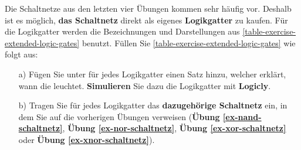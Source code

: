 \begin{exercise}\label{exercise-xor-nor-nand-xnor}
Die Schaltnetze aus den letzten vier Übungen kommen sehr häufig vor. Deshalb ist es möglich, \textbf{das Schaltnetz} direkt als eigenes \textbf{Logikgatter} zu kaufen. Für die Logikgatter werden die Bezeichnungen und Darstellungen aus \autoref{table-exercise-extended-logic-gates} benutzt. Füllen Sie \autoref{table-exercise-extended-logic-gates} wie folgt aus:

\begin{enumerate}
\item[a)] Fügen Sie unter  für jedes Logikgatter einen Satz hinzu, welcher erklärt, wann die  leuchtet. \textbf{Simulieren} Sie dazu die Logikgatter mit \textbf{Logicly}.
\item[b)] Tragen Sie für jedes Logikgatter das \textbf{dazugehörige Schaltnetz} ein, in dem Sie auf die vorherigen Übungen verweisen (\textbf{Übung \ref{ex-nand-schaltnetz}}, \textbf{Übung \ref{ex-nor-schaltnetz}}, \textbf{Übung \ref{ex-xor-schaltnetz}} oder \textbf{Übung \ref{ex-xnor-schaltnetz}}).
\end{enumerate}


\end{exercise}
